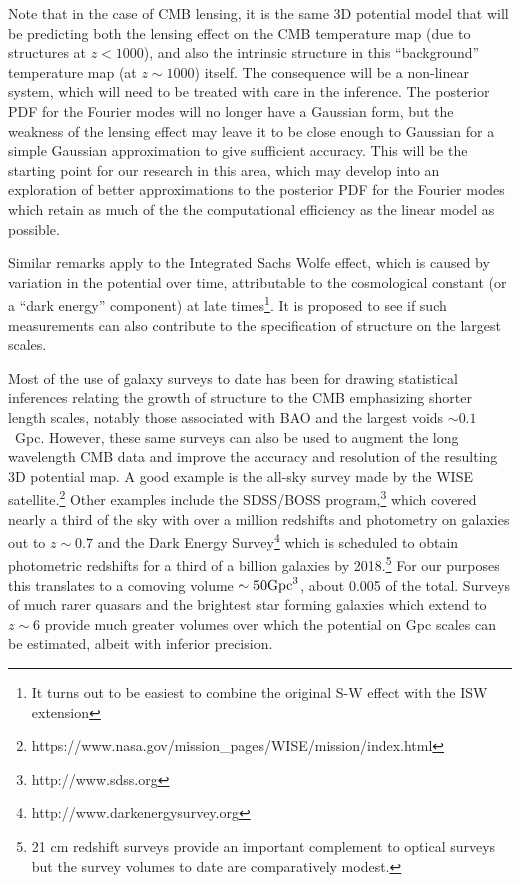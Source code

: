 \documentclass[psfig,12pt]{article}
\def\ni{\noindent}
\begin{document}
{Note that in the case of CMB lensing, it is the same 3D potential model
that will be predicting both the lensing effect on the CMB temperature
map (due to structures at $z < 1000$), and  also the intrinsic structure
in this ``background'' temperature map (at $z \sim 1000$) itself. The
consequence will be a non-linear system, which will need to be treated
with care in the inference. The posterior PDF for the Fourier modes will
no longer have a Gaussian form, but the weakness of the lensing effect
may leave it to be close enough to Gaussian for a simple Gaussian
approximation to give sufficient accuracy. This will be the starting
point for our research in this area, which may develop into an
exploration  of better approximations to the posterior PDF for the
Fourier modes  which retain as much of the the computational efficiency
as the linear model as possible.

Similar remarks apply to the Integrated Sachs Wolfe effect, which is
caused by variation in the potential over time, attributable to the
cosmological constant (or a ``dark energy'' component) at late times\footnote{It turns out to be easiest to combine the original S-W effect with the ISW extension}.
It is proposed to see if such
measurements can also contribute to the specification of structure on
the largest scales.

\ni{\bf Galaxy Surveys and the ``Local'' Universe:}
Most of the use of galaxy surveys to date has been for drawing statistical inferences
relating the growth of structure to the CMB emphasizing shorter length
scales, notably those associated with BAO and the largest voids
$\sim0.1$~Gpc. However, these same surveys can also be used to augment
the long wavelength CMB data and improve the accuracy and resolution of
the resulting 3D potential map. A good example is the
all-sky survey made by the WISE satellite.\footnote{https://www.nasa.gov/mission\_pages/WISE/mission/index.html}
Other examples include the SDSS/BOSS
program,\footnote{http://www.sdss.org} which covered nearly a third of
the sky with over a million redshifts and photometry on galaxies out to
$z\sim0.7$ and the Dark Energy Survey\footnote{http://www.darkenergysurvey.org} which is scheduled to obtain photometric redshifts for a third of a billion galaxies by 2018.\footnote{21 cm redshift surveys provide an important
complement to optical surveys but the survey volumes to date are
comparatively modest.} For our purposes this translates to a comoving
volume $\sim50{\rm Gpc}^3$, about 0.005 of the total. Surveys of much
rarer quasars and the brightest star forming galaxies which extend to
$z\sim6$ provide much greater volumes over which the potential on Gpc
scales can be estimated, albeit with inferior precision.

}
\end{document}

